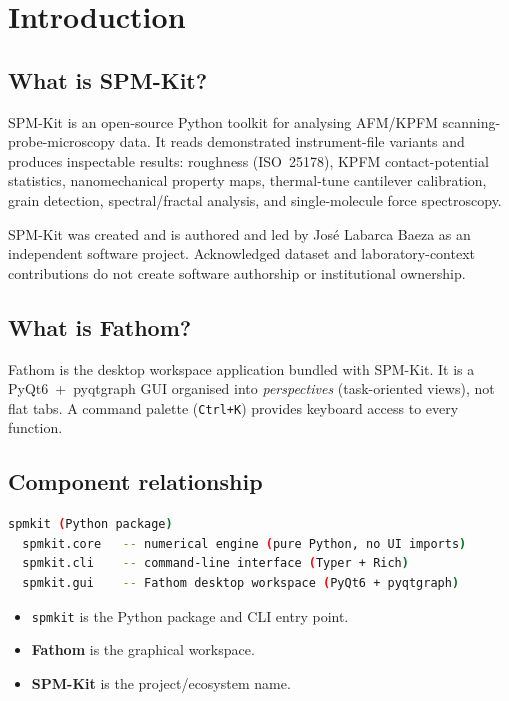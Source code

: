 \documentclass[a4paper,11pt]{article}
\begin{document}
\tableofcontents
\clearpage

\section{Introduction}

\subsection{What is SPM-Kit?}

SPM-Kit is an open-source Python toolkit for analysing AFM/KPFM scanning-probe-microscopy data.
It reads demonstrated instrument-file variants and produces inspectable results: roughness
(ISO~25178), KPFM contact-potential statistics, nanomechanical property maps,
thermal-tune cantilever calibration, grain detection, spectral/fractal analysis, and
single-molecule force spectroscopy.

SPM-Kit was created and is authored and led by Jos\'e Labarca Baeza as an independent
software project. Acknowledged dataset and laboratory-context contributions do not create
software authorship or institutional ownership.

\subsection{What is Fathom?}

Fathom is the desktop workspace application bundled with SPM-Kit. It is a PyQt6~+~pyqtgraph
GUI organised into \emph{perspectives} (task-oriented views), not flat tabs. A command
palette (\texttt{Ctrl+K}) provides keyboard access to every function.

\subsection{Component relationship}

\begin{lstlisting}[language=bash]
spmkit (Python package)
  spmkit.core   -- numerical engine (pure Python, no UI imports)
  spmkit.cli    -- command-line interface (Typer + Rich)
  spmkit.gui    -- Fathom desktop workspace (PyQt6 + pyqtgraph)
\end{lstlisting}

\begin{itemize}
  \item \texttt{spmkit} is the Python package and CLI entry point.
  \item \textbf{Fathom} is the graphical workspace.
  \item \textbf{SPM-Kit} is the project/ecosystem name.
\end{itemize}
\end{document}
